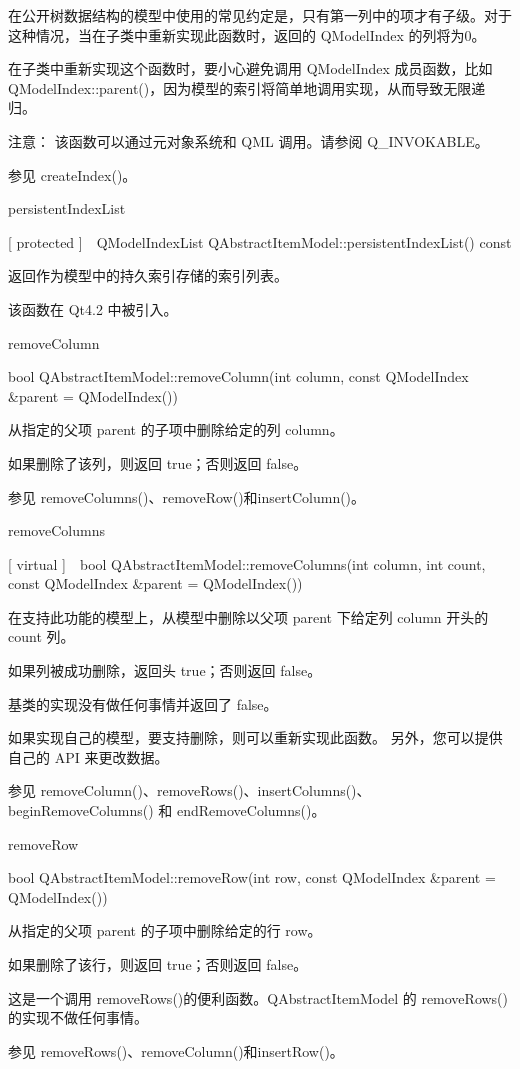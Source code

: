 在公开树数据结构的模型中使用的常见约定是，只有第一列中的项才有子级。对于这种情况，当在子类中重新实现此函数时，返回的 QModelIndex 的列将为0。

在子类中重新实现这个函数时，要小心避免调用 QModelIndex 成员函数，比如 QModelIndex::parent()，因为模型的索引将简单地调用实现，从而导致无限递归。

注意： 该函数可以通过元对象系统和 QML 调用。请参阅 Q\_INVOKABLE。

参见 createIndex()。

persistentIndexList

[ protected ] QModelIndexList QAbstractItemModel::persistentIndexList() const

返回作为模型中的持久索引存储的索引列表。

该函数在 Qt4.2 中被引入。

removeColumn

bool QAbstractItemModel::removeColumn(int column, const QModelIndex \&parent = QModelIndex())

从指定的父项 parent 的子项中删除给定的列 column。

如果删除了该列，则返回 true；否则返回 false。

参见 removeColumns()、removeRow()和insertColumn()。

removeColumns

[ virtual ] bool QAbstractItemModel::removeColumns(int column, int count, const QModelIndex \&parent = QModelIndex())

在支持此功能的模型上，从模型中删除以父项 parent 下给定列 column 开头的 count 列。

如果列被成功删除，返回头 true；否则返回 false。

基类的实现没有做任何事情并返回了 false。

如果实现自己的模型，要支持删除，则可以重新实现此函数。 另外，您可以提供自己的 API 来更改数据。

参见 removeColumn()、removeRows()、insertColumns()、beginRemoveColumns() 和 endRemoveColumns()。

removeRow

bool QAbstractItemModel::removeRow(int row, const QModelIndex \&parent = QModelIndex())

从指定的父项 parent 的子项中删除给定的行 row。

如果删除了该行，则返回 true；否则返回 false。

这是一个调用 removeRows()的便利函数。QAbstractItemModel 的 removeRows()的实现不做任何事情。

参见 removeRows()、removeColumn()和insertRow()。


